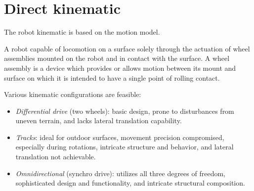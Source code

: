 \section{Direct kinematic}

The robot kinematic is based on the motion model. 
\begin{definition}
    A robot capable of locomotion on a surface solely through the actuation of wheel assemblies mounted on the robot and in contact with the surface. 
    A wheel assembly is a device which provides or allows motion between its mount and surface on which it is intended to have a single point of rolling contact.
\end{definition}

Various kinematic configurations are feasible:
\begin{itemize}
    \item \textit{Differential drive} (two wheels): basic design, prone to disturbances from uneven terrain, and lacks lateral translation capability.
    \item \textit{Tracks}: ideal for outdoor surfaces, movement precision compromised, especially during rotations, intricate structure and behavior, and lateral translation not achievable.
    \item \textit{Omnidirectional} (synchro drive): utilizes all three degrees of freedom, sophisticated design and functionality, and intricate structural composition.
\end{itemize}
